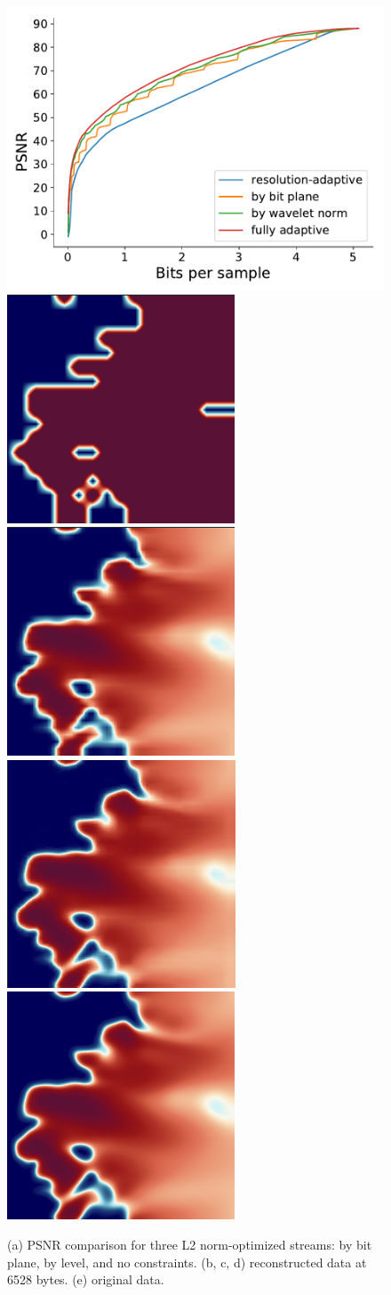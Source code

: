 \begin{figure}[htb!]
	\centering
	{\includegraphics[width=0.8\linewidth]{img/motivation/kflame-oh-motivation.pdf}}
	{\includegraphics[width=0.21\linewidth]{img/motivation/ERROR-(rmse)-GREEDY-BY-BIT-PLANE-(rmse).png}}
	{\includegraphics[width=0.21\linewidth]{img/motivation/ERROR-(rmse)-GREEDY-BY-LEVEL-(rmse).png}}
	{\includegraphics[width=0.21\linewidth]{img/motivation/ERROR-(rmse)-GREEDY-(rmse).png}}
	{\includegraphics[width=0.21\linewidth]{img/motivation/original.png}}
	\caption {(a) PSNR comparison for three L2 norm-optimized streams: by bit plane, by level, and no constraints. (b, c, d) reconstructed data at 6528 bytes. (e) original data.}
	\label{fig:motivation}
\end{figure}
